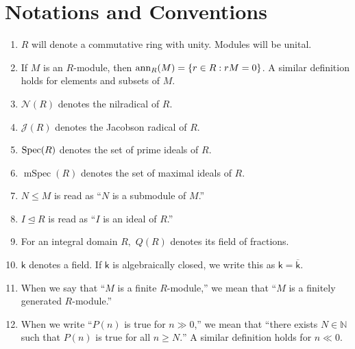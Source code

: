 \documentclass[12pt]{article}	%
\DeclareMathOperator{\mSpec}{mSpec}
\begin{document}


\coverpage

\updated{\today}

\thispagestyle{empty}
\tableofcontents
\newpage
\pagestyle{fancy}
\setcounter{page}{1}

\setcounter{section}{-1}

\section{Notations and Conventions}
\begin{enumerate}
	\item $R$ will denote a commutative ring with unity. Modules will be unital.
	\item If $M$ is an $R$-module, then $\operatorname{ann}_{R}(M) = \{r \in R : rM = 0\}$. \newline
	A similar definition holds for elements and subsets of $M$. 
	\item $\mathcal{N}(R)$ denotes the nilradical of $R.$
	\item $\mathcal{J}(R)$ denotes the Jacobson radical of $R.$
	\item $\operatorname{Spec}(R)$ denotes the set of prime ideals of $R.$
	\item $\mSpec(R)$ denotes the set of maximal ideals of $R.$
	\item $N \le M$ is read as ``$N$ is a submodule of $M$.''
	\item $I \unlhd R$ is read as ``$I$ is an ideal of $R$.''
	\item For an integral domain $R,$ $Q(R)$ denotes its field of fractions.
	\item $\mathsf{k}$ denotes a field. If $\mathsf{k}$ is algebraically closed, we write this as $\mathsf{k} = \overline{\mathsf{k}}.$ 
	\item When we say that ``$M$ is a finite $R$-module,'' we mean that ``$M$ is a finitely generated $R$-module.''
	\item When we write ``$P(n)$ is true for $n \gg 0$,'' we mean that ``there exists $N \in \mathbb{N}$ such that $P(n)$ is true for all $n \ge N.$'' A similar definition holds for $n \ll 0.$
\end{enumerate}
\end{document}

